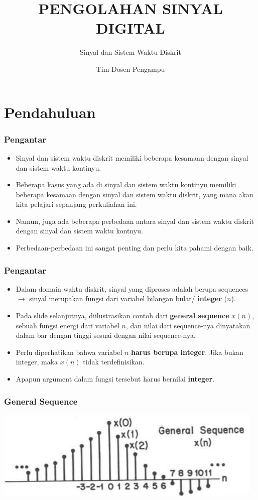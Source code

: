 \documentclass[pdflatex,compress]{beamer}
\title{PENGOLAHAN SINYAL DIGITAL}
\subtitle{Sinyal dan Sistem Waktu Diskrit}
\author{Tim Dosen Pengampu}
\begin{document}
\maketitle

\section{Pendahuluan}

\begin{frame}
	\frametitle{Pengantar}
	\begin{itemize}
		\item Sinyal dan sistem waktu diskrit memiliki beberapa kesamaan dengan sinyal dan sistem waktu kontinyu.
		\item Beberapa kasus yang ada di sinyal dan sistem waktu kontinyu memiliki beberapa kesamaan dengan sinyal dan sistem waktu diskrit, yang mana akan kita pelajari sepanjang perkuliahan ini.
		\item Namun, juga ada beberapa perbedaan antara sinyal dan sistem waktu diskrit dengan sinyal dan sistem waktu kontnyu.
		\item Perbedaan-perbedaan ini sangat penting dan perlu kita pahami dengan baik.
	\end{itemize}
\end{frame}

\begin{frame}
	\frametitle{Pengantar}
	\begin{itemize}
		\item Dalam domain waktu diskrit, sinyal yang diproses adalah berupa sequences $\rightarrow$ sinyal merupakan fungsi dari variabel bilangan bulat/ \textbf{integer} ($ n $).
		\item Pada slide selanjutnya, diilustrasikan contoh dari \textbf{general sequence} $ x(n) $, sebuah fungsi energi dari variabel $ n $, dan nilai dari sequence-nya dinyatakan dalam bar dengan tinggi sesuai dengan nilai sequence-nya.
		\item Perlu diperhatikan bahwa variabel $ n $ \textbf{harus berupa integer}. Jika bukan integer, maka $ x(n) $ tidak terdefinisikan.
		\item Apapun argument dalam fungsi tersebut harus bernilai \textbf{integer}.
	\end{itemize}
\end{frame}

\begin{frame}
	\frametitle{General Sequence}
	\begin{center}
		\includegraphics[width=\linewidth]{img/img001}
	\end{center}
\end{frame}
\end{document}
